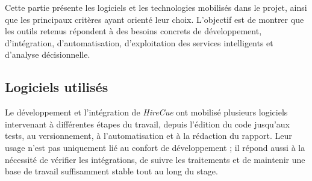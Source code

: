 Cette partie présente les logiciels et les technologies mobilisés dans le projet, ainsi que les principaux critères ayant orienté leur choix. L'objectif est de montrer que les outils retenus répondent à des besoins concrets de développement, d'intégration, d'automatisation, d'exploitation des services intelligents et d'analyse décisionnelle.

\subsection{Logiciels utilisés}

Le développement et l'intégration de \textit{HireCue} ont mobilisé plusieurs logiciels intervenant à différentes étapes du travail, depuis l'édition du code jusqu'aux tests, au versionnement, à l'automatisation et à la rédaction du rapport. Leur usage n'est pas uniquement lié au confort de développement ; il répond aussi à la nécessité de vérifier les intégrations, de suivre les traitements et de maintenir une base de travail suffisamment stable tout au long du stage.


